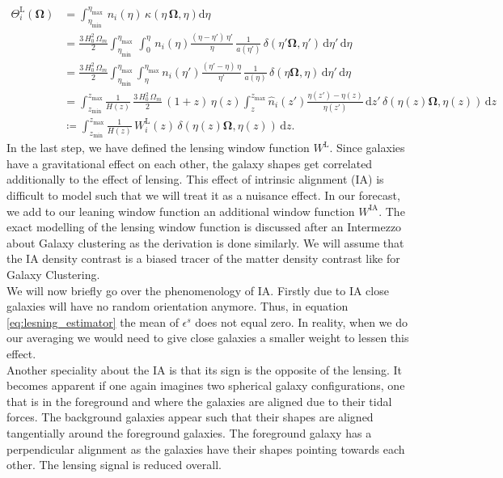\documentclass[oneside]{book}
\newcommand*{\rd}{\mathrm{d}}
\begin{document}
\begin{align}
\varTheta_i^\mathrm{L}(\boldsymbol{\Omega})&= \int_{\eta_\mathrm{min}}^{\eta_\mathrm{max}} \, n_i(\eta)\,\kappa(\eta\,\boldsymbol{\Omega},\eta) \rd\eta \\
&=  \frac{3\,H_0^2\,\Omega_m}{2} \int_{\eta_\mathrm{min}}^{\eta_\mathrm{max}}  \,\int_0^\eta \, n_i(\eta) \frac{(\eta-\eta')\,\eta'}{\eta}\,\frac{1}{a(\eta')}\,\delta(\eta'\boldsymbol{\Omega},\eta') \,\rd\eta' \, \rd\eta \nonumber \\
&= \frac{3\,H_0^2\,\Omega_m}{2} \int_{\eta_\mathrm{min}}^{\eta_\mathrm{max}} \int_{\eta}^{\eta_\mathrm{max}} n_i(\eta') \frac{(\eta'-\eta)\,\eta}{\eta'}\,\frac{1}{a(\eta)}\,\delta(\eta\boldsymbol{\Omega},\eta) \,\rd\eta' \, \rd\eta \nonumber\\
&= \int_{z_\mathrm{min}}^{z_\mathrm{max}} \frac{1}{H(z)}\,\frac{3\,H_0^2\,\Omega_m}{2}\, (1+z)\,\eta(z) \int_z^{z_\mathrm{max}} \hat{n}_i(z') \frac{\eta(z')-\eta(z)}{\eta(z')} \,\rd z' \,\delta(\eta(z)\boldsymbol{\Omega},\eta(z)) \,\rd z \nonumber \\
\label{eq:lensing_observable}&\coloneqq \int_{z_\mathrm{min}}^{z_\mathrm{max}} \frac{1}{H(z)}\, W_i^\mathrm{L}(z) \,\delta(\eta(z)\boldsymbol{\Omega},\eta(z)) \,\rd z. 
\end{align} 
In the last step, we have defined the lensing window function $W^\mathrm{L}$. Since galaxies have a gravitational effect on each other, the galaxy shapes get correlated additionally to the effect of lensing. This effect of intrinsic alignment (IA) is difficult to model such that we will treat it as a nuisance effect. In our forecast, we add to our leaning window function an additional window function $W^\mathrm{IA}$. The exact modelling of the lensing window function is discussed after an Intermezzo about Galaxy clustering as the derivation is done similarly. We will assume that the IA density contrast is a biased tracer of the matter density contrast like for Galaxy Clustering.\\
We will now briefly go over the phenomenology of IA. Firstly due to IA close galaxies will have no random orientation anymore. Thus, in equation \ref{eq:lesning_estimator} the mean of $\epsilon^s$ does not equal zero. In reality, when we do our averaging we would need to give close galaxies a smaller weight to lessen this effect.\\
Another speciality about the IA is that its sign is the opposite of the lensing. It becomes apparent if one again imagines two spherical galaxy configurations, one that is in the foreground and where the galaxies are aligned due to their tidal forces. The background galaxies appear such that their shapes are aligned tangentially around the foreground galaxies. The foreground galaxy has a perpendicular alignment as the galaxies have their shapes pointing towards each other. The lensing signal is reduced overall.\\
\end{document}
